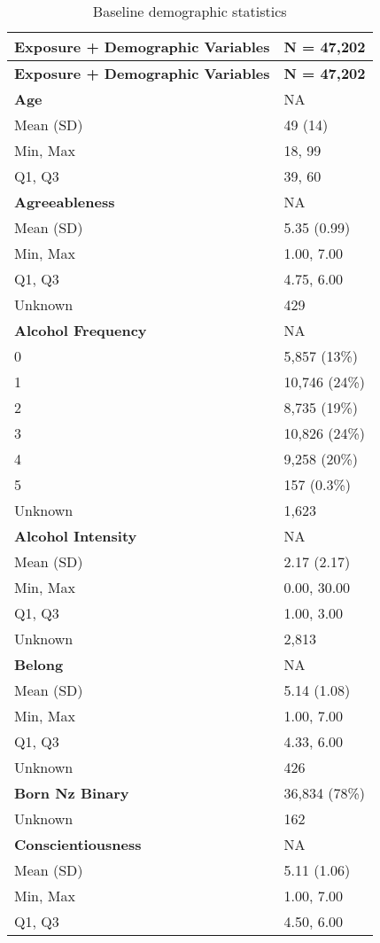 \documentclass[
  single column]{article}
\begin{document}
\begin{longtable}[]{@{}ll@{}}
\caption{Baseline demographic
statistics}\label{tbl-table-demography}\tabularnewline
\toprule\noalign{}
\textbf{Exposure + Demographic Variables} & \textbf{N = 47,202} \\
\midrule\noalign{}
\endfirsthead
\toprule\noalign{}
\textbf{Exposure + Demographic Variables} & \textbf{N = 47,202} \\
\midrule\noalign{}
\endhead
\bottomrule\noalign{}
\endlastfoot
\textbf{Age} & NA \\
Mean (SD) & 49 (14) \\
Min, Max & 18, 99 \\
Q1, Q3 & 39, 60 \\
\textbf{Agreeableness} & NA \\
Mean (SD) & 5.35 (0.99) \\
Min, Max & 1.00, 7.00 \\
Q1, Q3 & 4.75, 6.00 \\
Unknown & 429 \\
\textbf{Alcohol Frequency} & NA \\
0 & 5,857 (13\%) \\
1 & 10,746 (24\%) \\
2 & 8,735 (19\%) \\
3 & 10,826 (24\%) \\
4 & 9,258 (20\%) \\
5 & 157 (0.3\%) \\
Unknown & 1,623 \\
\textbf{Alcohol Intensity} & NA \\
Mean (SD) & 2.17 (2.17) \\
Min, Max & 0.00, 30.00 \\
Q1, Q3 & 1.00, 3.00 \\
Unknown & 2,813 \\
\textbf{Belong} & NA \\
Mean (SD) & 5.14 (1.08) \\
Min, Max & 1.00, 7.00 \\
Q1, Q3 & 4.33, 6.00 \\
Unknown & 426 \\
\textbf{Born Nz Binary} & 36,834 (78\%) \\
Unknown & 162 \\
\textbf{Conscientiousness} & NA \\
Mean (SD) & 5.11 (1.06) \\
Min, Max & 1.00, 7.00 \\
Q1, Q3 & 4.50, 6.00 \\

\end{longtable}
\end{document}
